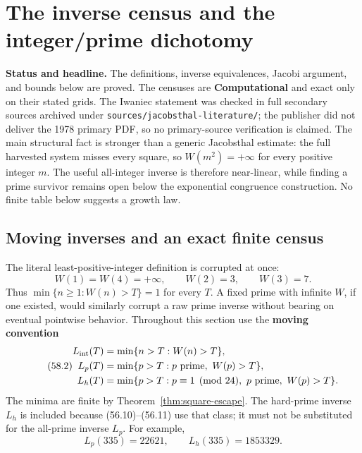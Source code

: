 \documentclass[10pt,reqno]{amsart}
\theoremstyle{definition}
\newcommand{\1}{\mathbf 1}
\begin{document}
\section{The inverse census and the integer/prime dichotomy}
\label{sec:inverse-census}
\medskip\noindent\textbf{Status and headline.}
The definitions, inverse equivalences, Jacobi argument, and bounds below are
proved.  The censuses are \textbf{Computational} and exact only on their
stated grids.  The Iwaniec statement was checked in full secondary sources
archived under \texttt{sources/jacobsthal-literature/}; the publisher did
not deliver the 1978 primary PDF, so no primary-source verification is
claimed.  The main structural fact is stronger than a generic Jacobsthal
estimate: the full harvested system misses every square, so
$W(m^2)=+\infty$ for every positive integer $m$.  The useful all-integer
inverse is therefore near-linear, while finding a prime survivor remains
open below the exponential congruence construction.  No finite table below
suggests a growth law.

\subsection{Moving inverses and an exact finite census}
The literal least-positive-integer definition is corrupted at once:
\begin{equation}\tag{58.1}
 W(1)=W(4)=+\infty,\qquad W(2)=3,\qquad W(3)=7.
\end{equation}
Thus $\min\{n\geq1:W(n)>T\}=1$ for every $T$.  A fixed prime with infinite
$W$, if one existed, would similarly corrupt a raw prime inverse without
bearing on eventual pointwise behavior.  Throughout this section use the
\textbf{moving convention}
\begin{equation}\tag{58.2}
 \begin{split}
 L_{\rm int}(T)&=\min\{n>T:W(n)>T\},\\
 L_p(T)&=\min\{p>T:p\text{ prime},\ W(p)>T\},\\
 L_h(T)&=\min\{p>T:p\equiv1\pmod {24},\ p\text{ prime},\ W(p)>T\}.
 \end{split}
\end{equation}
The minima are finite by Theorem~\ref{thm:square-escape}.  The hard-prime
inverse $L_h$ is included because (56.10)--(56.11) use that class; it must
not be substituted for the all-prime inverse $L_p$.  For example,
\begin{equation*}
                     L_p(335)=22621,
       \qquad L_h(335)=1853329.
\end{equation*}
\end{document}
